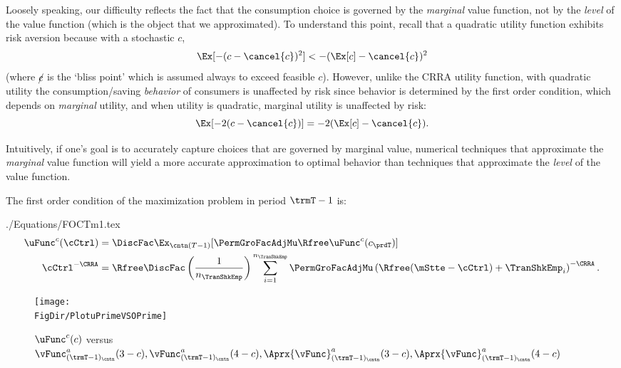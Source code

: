 \documentclass[\econtexRoot/SolvingMicroDSOPs]{subfiles}
\begin{document}
Loosely speaking, our difficulty reflects the fact that the
consumption choice is governed by the \textit{marginal} value function,
not by the \textit{level} of the value function (which is the object that
we approximated).  To understand this point, recall that a quadratic
utility function
exhibits risk aversion because with a stochastic ${c}$,
\begin{equation}
  \Ex[-({c} - \cancel{c})^{2}] < - (\Ex[{c}] - \cancel{c})^{2}
\end{equation}
(where $\cancel{c}$ is the `bliss point' which is assumed always to exceed feasible ${c}$). However, unlike the CRRA utility function,
with quadratic utility the consumption/saving \textit{behavior} of consumers
is unaffected by risk since behavior is determined by the first order condition, which
depends on \textit{marginal} utility, and when utility is quadratic, marginal utility is unaffected
by risk:
\begin{equation}
  \Ex[-2({c} - \cancel{c})] = - 2(\Ex[{c}] - \cancel{c}).
\end{equation}

Intuitively, if one's goal is to accurately capture choices
that are governed by marginal value,
numerical techniques that approximate the \textit{marginal} value
function will yield a more accurate approximation to
optimal behavior than techniques that approximate the \textit{level}
of the value function.

The first order condition of the maximization problem in period $\trmT-1$ is:
\begin{verbatimwrite}{./Equations/FOCTm1.tex}
  \begin{equation}\begin{gathered}\begin{aligned}
        \uFunc^{{c}}(\cCtrl)       & = \DiscFac \Ex_{\cntn(T-1)} [\PermGroFacAdjMu\Rfree \uFunc^{{c}}({c}_{\prdT})]  %
        \\      \cCtrl^{-\CRRA}   & = \Rfree \DiscFac \left(\frac{1}{n_{\TranShkEmp}}\right) \sum_{i=1}^{n_{\TranShkEmp}} \PermGroFacAdjMu\left(\Rfree (\mStte-\cCtrl) + \TranShkEmp_{i}\right)^{-\CRRA} \label{eq:FOCTm1}.
      \end{aligned}\end{gathered}\end{equation}
\end{verbatimwrite}
\unskip
\hypertarget{PlotuPrimeVSOPrime}{}
\begin{figure}
  \centerline{\texttt{[image: \\FigDir/PlotuPrimeVSOPrime]}}
  \caption{$\uFunc^{{c}}(c)$ versus $\vFunc_{({\trmT-1})_\cntn}^{{a}}(3-c), \vFunc_{({\trmT-1})_\cntn}^{{a}}(4-c), \Aprx{\vFunc}_{({\trmT-1})_\cntn}^{{a}}(3-c), \Aprx{\vFunc}_{({\trmT-1})_\cntn}^{{a}}(4-c)$}
  \label{fig:PlotuPrimeVSOPrime}
\end{figure}
\end{document}
